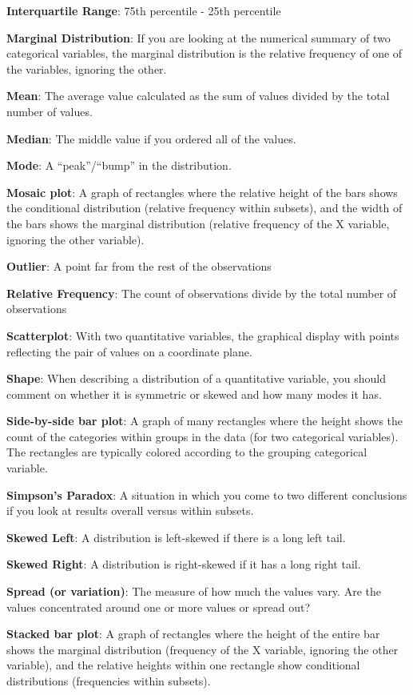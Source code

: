 \documentclass[
]{book}
\begin{document}
\textbf{Interquartile Range}: 75th percentile - 25th percentile

\textbf{Marginal Distribution}: If you are looking at the numerical summary of two categorical variables, the marginal distribution is the relative frequency of one of the variables, ignoring the other.

\textbf{Mean}: The average value calculated as the sum of values divided by the total number of values.

\textbf{Median}: The middle value if you ordered all of the values.

\textbf{Mode}: A ``peak''/``bump'' in the distribution.

\textbf{Mosaic plot}: A graph of rectangles where the relative height of the bars shows the conditional distribution (relative frequency within subsets), and the width of the bars shows the marginal distribution (relative frequency of the X variable, ignoring the other variable).

\textbf{Outlier}: A point far from the rest of the observations

\textbf{Relative Frequency}: The count of observations divide by the total number of observations

\textbf{Scatterplot}: With two quantitative variables, the graphical display with points reflecting the pair of values on a coordinate plane.

\textbf{Shape}: When describing a distribution of a quantitative variable, you should comment on whether it is symmetric or skewed and how many modes it has.

\textbf{Side-by-side bar plot}: A graph of many rectangles where the height shows the count of the categories within groups in the data (for two categorical variables). The rectangles are typically colored according to the grouping categorical variable.

\textbf{Simpson's Paradox}: A situation in which you come to two different conclusions if you look at results overall versus within subsets.

\textbf{Skewed Left}: A distribution is left-skewed if there is a long left tail.

\textbf{Skewed Right}: A distribution is right-skewed if it has a long right tail.

\textbf{Spread (or variation)}: The measure of how much the values vary. Are the values concentrated around one or more values or spread out?

\textbf{Stacked bar plot}: A graph of rectangles where the height of the entire bar shows the marginal distribution (frequency of the X variable, ignoring the other variable), and the relative heights within one rectangle show conditional distributions (frequencies within subsets).
\end{document}
